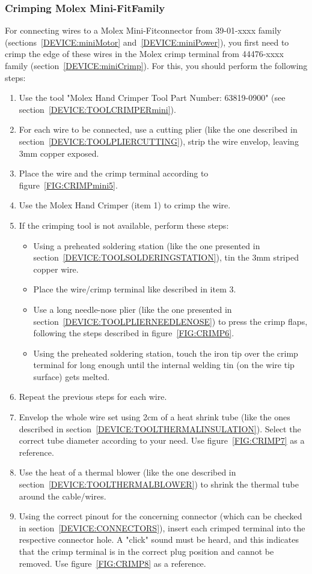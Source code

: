 \subsubsection{Crimping Molex Mini-Fit\textregistered Family} \label{CRIMPINGmini}
For connecting wires to a Molex Mini-Fit\textregistered connector from 39-01-xxxx family (sections~\ref{DEVICE:miniMotor} and~\ref{DEVICE:miniPower}), you first need to crimp the edge of these wires in the Molex crimp terminal from 44476-xxxx family (section~\ref{DEVICE:miniCrimp}). For this, you should perform the following steps:
\begin{enumerate}
  \item Use the tool "Molex Hand Crimper Tool Part Number: 63819-0900" (see section~\ref{DEVICE:TOOLCRIMPERmini}).
  \item For each wire to be connected, use a cutting plier (like the one described in section~\ref{DEVICE:TOOLPLIERCUTTING}), strip the wire envelop, leaving 3mm copper exposed.
  \item Place the wire and the crimp terminal according to figure~\ref{FIG:CRIMPmini5}.
  \item Use the Molex Hand Crimper (item 1) to crimp the wire.
  \item If the crimping tool is not available, perform these steps:
  \begin{itemize}
    \item Using a preheated soldering station (like the one presented in section~\ref{DEVICE:TOOLSOLDERINGSTATION}), tin the 3mm striped copper wire.
    \item Place the wire/crimp terminal like described in item 3.
    \item Use a long needle-nose plier (like the one presented in section~\ref{DEVICE:TOOLPLIERNEEDLENOSE}) to press the crimp flaps, following the steps described in figure~\ref{FIG:CRIMP6}.
    \item Using the preheated soldering station, touch the iron tip over the crimp terminal for long enough until the internal welding tin (on the wire tip surface) gets melted.
  \end{itemize}
  \item Repeat the previous steps for each wire.
  \item Envelop the whole wire set using 2cm of a heat shrink tube (like the ones described in section~\ref{DEVICE:TOOLTHERMALINSULATION}). Select the correct tube diameter according to your need. Use figure~\ref{FIG:CRIMP7} as a reference.
  \item Use the heat of a thermal blower (like the one described in section~\ref{DEVICE:TOOLTHERMALBLOWER}) to shrink the thermal tube around the cable/wires.
  \item Using the correct pinout for the concerning connector (which can be checked in section~\ref{DEVICE:CONNECTORS}), insert each crimped terminal into the respective connector hole. A "click" sound must be heard, and this indicates that the crimp terminal is in the correct plug position and cannot be removed. Use figure~\ref{FIG:CRIMP8} as a reference.
\end{enumerate}
